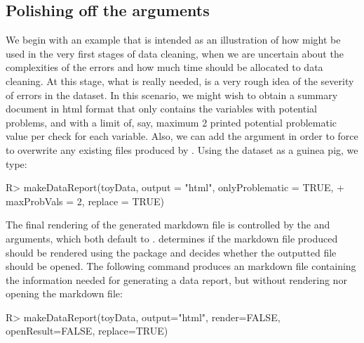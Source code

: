 \documentclass[article,shortnames]{jss}
\begin{document}

\subsection{Polishing off the arguments}
We begin with an example that is intended as an illustration of how
 might be used in the very first stages of data
cleaning, when we are uncertain about the complexities of the
errors and how much time should be allocated to data cleaning. At
this stage, what is really needed, is a very rough idea of the
severity of errors in the dataset. In this scenario, we might wish to
obtain a summary document in html format that only contains the
variables with potential problems, and with a limit of, say, maximum
2 printed potential problematic value per check for each variable. Also, we can add the
argument  in order to force  to
overwrite any existing files produced by .  Using the
 dataset as a guinea pig, we type:
  
\begin{Schunk}
\begin{Sinput}
R> makeDataReport(toyData, output = "html", onlyProblematic = TRUE,
+     maxProbVals = 2, replace = TRUE)
\end{Sinput}
\end{Schunk}

The final rendering of the generated markdown file is controlled by
the  and  arguments, which both default to
.  determines if the  markdown file
produced should be rendered using the  \citep{rmarkdown} package and
 decides whether the outputted file should be
opened. The following command produces an  markdown file
containing the information needed for generating a data report, but without
rendering nor opening the markdown file:

\begin{Schunk}
\begin{Sinput}
R> makeDataReport(toyData, output="html", render=FALSE, openResult=FALSE, replace=TRUE)
\end{Sinput}
\end{Schunk}
\end{document}
